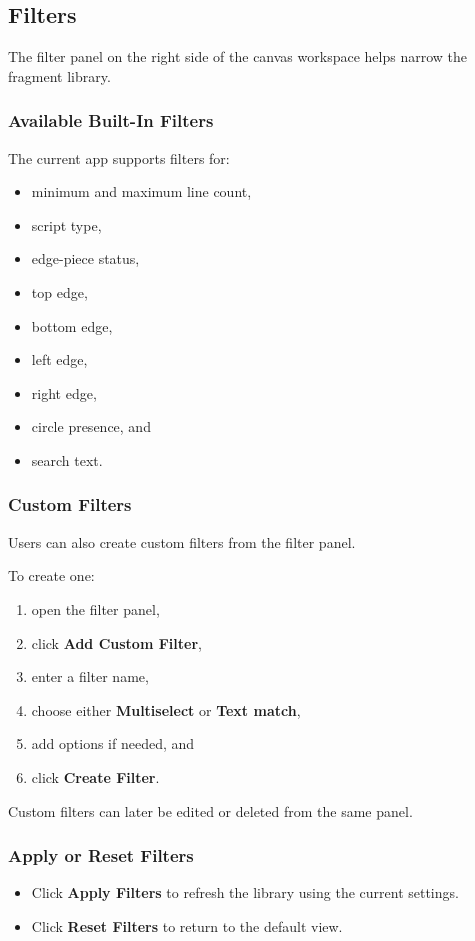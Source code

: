 \documentclass[12pt]{article}
\begin{document}
\subsection{Filters}
The filter panel on the right side of the canvas workspace helps narrow the fragment library.

\subsubsection{Available Built-In Filters}
The current app supports filters for:
\begin{itemize}
  \item minimum and maximum line count,
  \item script type,
  \item edge-piece status,
  \item top edge,
  \item bottom edge,
  \item left edge,
  \item right edge,
  \item circle presence, and
  \item search text.
\end{itemize}

\subsubsection{Custom Filters}
Users can also create custom filters from the filter panel.

To create one:
\begin{enumerate}
  \item open the filter panel,
  \item click \textbf{Add Custom Filter},
  \item enter a filter name,
  \item choose either \textbf{Multiselect} or \textbf{Text match},
  \item add options if needed, and
  \item click \textbf{Create Filter}.
\end{enumerate}

Custom filters can later be edited or deleted from the same panel.

\subsubsection{Apply or Reset Filters}
\begin{itemize}
  \item Click \textbf{Apply Filters} to refresh the library using the current settings.
  \item Click \textbf{Reset Filters} to return to the default view.
\end{itemize}
\end{document}
